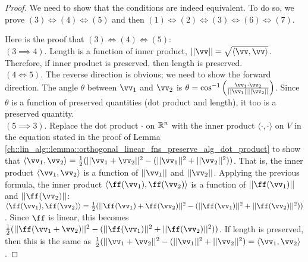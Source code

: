 \begin{proof}
    We need to show that the conditions are indeed equivalent. To do so, we prove $(3) \iff (4) \iff (5)$ and then $(1) \iff (2) \iff (3) \iff (6) \iff (7)$.
    
    \vspace{.2cm}
    
    Here is the proof that $(3) \iff (4) \iff (5)$:
    \\ \indent $(3 \implies 4)$. Length is a function of inner product, $||\vv|| = \sqrt{\langle \vv, \vv \rangle}$. Therefore, if inner product is preserved, then length is preserved.
    \\ \indent $(4 \iff 5)$. The reverse direction is obvious; we need to show the forward direction. The angle $\theta$ between $\vv_1$ and $\vv_2$ is $\theta = \cos^{-1}\Big(\frac{\vv_1 \cdot \vv_2}{||\vv_1||||\vv_2||}\Big)$. Since $\theta$ is a function of preserved quantities (dot product and length), it too is a preserved quantity.
    \\ \indent $(5 \implies 3)$. Replace the dot product $\cdot$ on $\mathbb{R}^n$ with the inner product $\langle \cdot, \cdot \rangle$ on $V$ in the equation stated in the proof of Lemma \ref{ch::lin_alg::lemma::orthogonal_linear_fns_preserve_alg_dot_product} to show that $\langle \vv_1, \vv_2 \rangle = \frac{1}{2}(||\vv_1 + \vv_2||^2 - (||\vv_1||^2 + ||\vv_2||^2))$. That is, the inner product $\langle \vv_1, \vv_2 \rangle$ is a function of $||\vv_1||$ and $||\vv_2||$. Applying the previous formula, the inner product $\langle \ff(\vv_1), \ff(\vv_2) \rangle$ is a function of $||\ff(\vv_1)||$ and $||\ff(\vv_2)||$: ${\langle \ff(\vv_1), \ff(\vv_2) \rangle = \frac{1}{2}(||\ff(\vv_1) + \ff(\vv_2)||^2 - (||\ff(\vv_1)||^2 + ||\ff(\vv_2)||^2))}$. Since $\ff$ is linear, this becomes $\frac{1}{2}(||\ff(\vv_1 + \vv_2)||^2 - (||\ff(\vv_1)||^2 + ||\ff(\vv_2)||^2))$. If length is preserved, then this is the same as $\frac{1}{2}(||\vv_1 + \vv_2||^2 - (||\vv_1||^2 + ||\vv_2||^2) = \langle \vv_1, \vv_2 \rangle$.

    \vspace{.2cm}


\end{proof}

